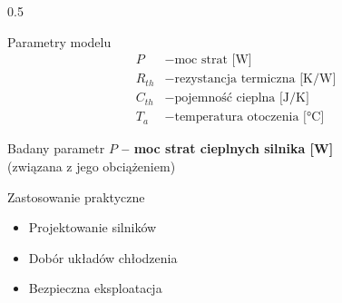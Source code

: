 \documentclass[10pt, aspectratio=169, t]{beamer}
\begin{document}
\begin{frame}
\begin{columns}[T]
		\begin{column}{0.5\textwidth}
			\begin{block}{Parametry modelu}
				\[
				\begin{aligned}
					P &- \text{moc strat [W]} \\
					R_{th} &- \text{rezystancja termiczna [K/W]} \\
					C_{th} &- \text{pojemność cieplna [J/K]} \\
					T_a &- \text{temperatura otoczenia [°C]}
				\end{aligned}
				\]
			\end{block}
			\vspace{-0.3cm}
			\begin{alertblock}{Badany parametr}
				\centering
				\vspace{0.1cm}
				\textbf{$P$ – moc strat cieplnych silnika [W]} \\
				\small(związana z jego obciążeniem)
				\vspace{0.1cm}
			\end{alertblock}
			
			\begin{block}{Zastosowanie praktyczne}
				\begin{itemize}
					\item Projektowanie silników
					\item Dobór układów chłodzenia
					\item Bezpieczna eksploatacja
				\end{itemize}
			\end{block}
		\end{column}
	\end{columns}
\end{frame}
\end{document}
